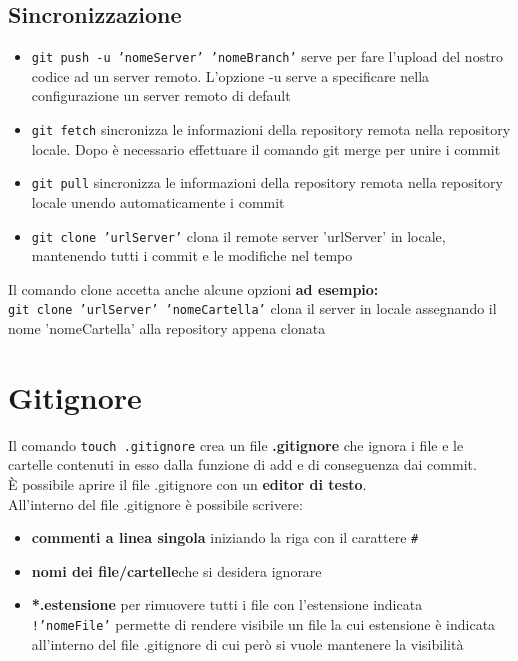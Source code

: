 \documentclass[12pt, a4paper]{article}
\begin{document}
\subsection{Sincronizzazione}
\begin{itemize}
    \item \texttt{git push -u 'nomeServer' 'nomeBranch'} serve per fare l’upload del nostro codice ad un server remoto. L’opzione -u serve a specificare nella configurazione un server remoto di default
    \item \texttt{git fetch} sincronizza le informazioni della repository remota nella repository locale. Dopo è necessario effettuare il comando git merge per unire i commit
    \item \texttt{git pull} sincronizza le informazioni della repository remota nella repository locale unendo automaticamente i commit
    \item \texttt{git clone 'urlServer'} clona il remote server 'urlServer' in locale, mantenendo tutti i commit e le modifiche nel tempo
\end{itemize}
Il comando clone accetta anche alcune opzioni \textbf{ad esempio:}\\
\texttt{git clone 'urlServer' 'nomeCartella'} clona il server in locale assegnando il nome 'nomeCartella' alla repository appena clonata
\clearpage
\section{Gitignore}
Il comando \texttt{touch .gitignore} crea un file \textbf{.gitignore} che ignora i file e le cartelle contenuti in esso dalla funzione di add e di conseguenza dai commit.\\
È possibile aprire il file .gitignore con un \textbf{editor di testo}.\\
All’interno del file .gitignore è possibile scrivere:
\begin{itemize}
    \item \textbf{commenti a linea singola} iniziando la riga con il carattere \texttt{\#}
    \item \textbf{nomi dei file/cartelle}che si desidera ignorare
    \item \textbf{*.estensione} per rimuovere tutti i file con l’estensione indicata\\
    \texttt{!'nomeFile'} permette di rendere visibile un file la cui estensione è indicata all’interno del file .gitignore di cui però si vuole mantenere la visibilità
\end{itemize}
\end{document}
